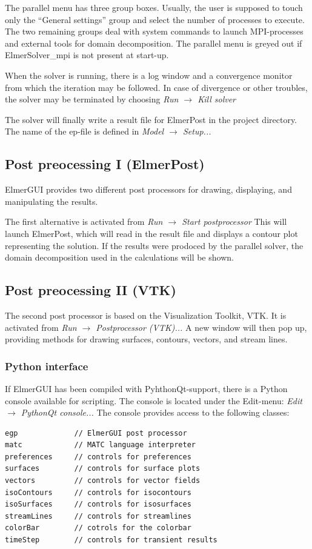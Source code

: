 \documentclass[a4paper,12pt]{article}
\newcommand{\menu}[2]{{\it \vskip2mm #1 $\rightarrow$ #2 \vskip2mm}}
\begin{document}
The parallel menu has three group boxes. Usually, the user is supposed to touch
only the ``General settings'' group and select the number of processes to execute.
The two remaining groups deal with system commands to launch MPI-processes and
external tools for domain decomposition.  The parallel menu is greyed out if
ElmerSolver\_mpi is not present at start-up.

When the solver is running, there is a log window and a convergence monitor
from which the iteration may be followed. In case of divergence or other troubles,
the solver may be terminated by choosing
\menu{Run}{Kill solver}

The solver will finally write a result file for ElmerPost in the project directory.
The name of the ep-file is defined in
\menu{Model}{Setup...}

\subsection{Post preocessing I (ElmerPost)}

ElmerGUI provides two different post processors for drawing, displaying, and manipulating the results.

The first alternative is activated from
\menu{Run}{Start postprocessor}
\noindent This will launch ElmerPost, which will read in the result file and displays a contour plot representing the solution. If the results were prodoced by the parallel solver, the domain decomposition used in the calculations will be shown.

\subsection{Post preocessing II (VTK)}

The second post processor is based on the Visualization Toolkit, VTK. It is activated from
\menu{Run}{Postprocessor (VTK)...}
\noindent A new window will then pop up, providing methods for drawing surfaces, contours,
vectors, and stream lines.

\subsubsection{Python interface}

If ElmerGUI has been compiled with PyhthonQt-support, there is a Python console
available for scripting. The console is located under the Edit-menu:
\menu{Edit}{PythonQt console...}
\noindent The console provides access to the following classes:
\begin{footnotesize}
\begin{verbatim}
egp             // ElmerGUI post processor
matc            // MATC language interpreter
preferences     // controls for preferences
surfaces        // controls for surface plots
vectors	        // controls for vector fields
isoContours     // controls for isocontours
isoSurfaces     // controls for isosurfaces
streamLines     // controls for streamlines
colorBar        // cotrols for the colorbar
timeStep        // controls for transient results
\end{verbatim}
\end{footnotesize}
\end{document}
